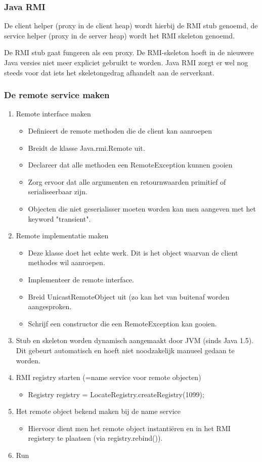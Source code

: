 \documentclass[a4paper,12pt]{article}
\begin{document}
\subsubsection{Java RMI}
De client helper (proxy in de client heap) wordt hierbij de RMI stub genoemd, de service helper (proxy in de server heap) wordt het RMI skeleton genoemd.

De RMI stub gaat fungeren als een proxy.
De RMI-skeleton hoeft in de nieuwere Java versies niet meer expliciet gebruikt te worden.
Java RMI zorgt er wel nog steeds voor dat iets het skeletongedrag afhandelt aan de serverkant.

\subsubsection{De remote service maken}
\begin{enumerate}
\item Remote interface maken
	\begin{itemize}
	\item Definieert de remote methoden die de client kan aanroepen
	\item Breidt de klasse Java.rmi.Remote uit.
	\item Declareer dat alle methoden een RemoteException kunnen gooien
	\item Zorg ervoor dat alle argumenten en retournwaarden primitief of serialiseerbaar zijn.
	\item Objecten die niet geserialisser moeten worden kan men aangeven met het keyword "transient".
	\end{itemize}
\item Remote implementatie maken
	\begin{itemize}
	\item Deze klasse doet het echte werk.
	Dit is het object waarvan de client methodes wil aanroepen.
	\item Implementeer de remote interface.
	\item Breid UnicastRemoteObject uit (zo kan het van buitenaf worden aangesproken.
	\item Schrijf een constructor die een RemoteException kan gooien.
	\end{itemize}
\item Stub en skeleton worden dynamisch aangemaakt door JVM (sinds Java 1.5).
Dit gebeurt automatisch en hoeft niet noodzakelijk manueel gedaan te worden.
\item RMI registry starten (=name service voor remote objecten)
	\begin{itemize}
	\item Registry registry = LocateRegistry.createRegistry(1099);
	\end{itemize}
\item Het remote object bekend maken bij de name service
	\begin{itemize}
	\item Hiervoor dient men het remote object instantiëren en in het RMI registery te plaatsen (via registry.rebind()).
	\end{itemize}
\item Run
\end{enumerate}
\end{document}
